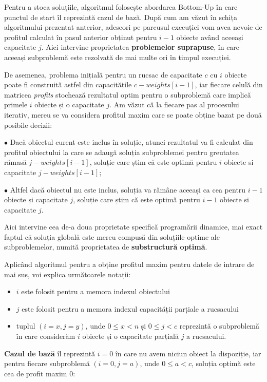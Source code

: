 \begin{sloppypar}
Pentru a stoca soluțiile, algoritmul folosește abordarea Bottom-Up în care punctul de start îl reprezintă cazul de bază. După cum am văzut în schița algoritmului prezentat anterior, adeseori pe parcusul execuției vom avea nevoie de profitul calculat în pasul anterior obținut pentru \(i - 1\) obiecte având aceeași capacitate \(j\). Aici intervine proprietatea \textbf{problemelor suprapuse}, în care aceeași subproblemă este rezolvată de mai multe ori în timpul execuției. \par
De asemenea, problema inițială pentru un rucsac de capacitate \(c\) cu \(i\) obiecte poate fi construită astfel din capacitățile \(c - weights[i - 1]\), 
iar fiecare celulă din matricea \textit{profits} stochează rezultatul optim pentru o subproblemă care implică primele \(i\) obiecte și o capacitate \(j\). Am văzut că la fiecare pas al procesului iterativ, mereu se va considera profitul maxim care se poate obține bazat pe două posibile decizii: \par
$\bullet$ Dacă obiectul curent este inclus în soluție, atunci rezultatul va fi calculat din profitul obiectului la care se adaugă soluția subproblemei pentru greutatea rămasă \(j - weights[i - 1]\), soluție care știm că este optimă pentru \(i\) obiecte si capacitate \(j - weights[i - 1]\); \par
$\bullet$ Altfel dacă obiectul nu este inclus, soluția va rămâne aceeași ca cea pentru \(i - 1\) obiecte și capacitate \(j\), soluție care știm că este optimă pentru \(i - 1\) obiecte si capacitate \(j\). \par
Aici intervine cea de-a doua proprietate specifică programării dinamice, mai exact faptul că soluția globală este mereu compusă din soluțiile optime ale subproblemelor, numită proprietatea de \textbf{substructură optimă}.
\\ \par
Aplicând algoritmul pentru a obține profitul maxim pentru datele de intrare de mai sus, voi explica următoarele notații:
\begin{itemize}
    \item $i$ este folosit pentru a memora indexul obiectului
    \item $j$ este folosit pentru a memora indexul capacității parțiale a rucsacului
    \item tuplul $(i = x, j = y)$, unde $0 \le x < n$ și $0 \le j < c$ reprezintă o subproblemă în care considerăm $i$ obiecte și o capacitate parțială $j$ a rucsacului.
\end{itemize}
\par
\textbf{Cazul de bază} îl reprezintă $i = 0$ în care nu avem niciun obiect la dispoziție, iar pentru fiecare subproblemă $(i = 0, j = a)$, unde $0 \le a < c$, soluția optimă este cea de profit maxim 0:


\end{sloppypar}
